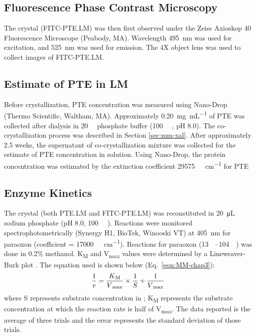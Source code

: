 \begin{refsection}
\subsection{Fluorescence Phase Contrast Microscopy}

The crystal (FITC-PTE.LM) was then first observed under the Zeiss Axioskop 40
Fluorescence Microscope (Peabody, MA).  Wavelength \SI{495}{\nm} was used for
excitation, and \SI{525}{\nm} was used for emission. The 4X object lens was used to
collect images of FITC-PTE.LM.

\subsection{Estimate of PTE in LM}

Before crystallization, PTE concentration was measured using Nano-Drop (Thermo
Scientific, Waltham, MA). Approximately \SI{0.20}{\mg\per\mL} of PTE was
collected after dialysis in \SI{20}{\milli\Molar} phosphate buffer
(\SI{100}{\micro\Molar} , pH 8.0). The co-crystallization process was
described in Section \ref{sec:mm-xal}. After approximately 2.5 weeks, the
supernatant of co-crystallization mixture was collected for the estimate of PTE
concentration in solution. Using Nano-Drop, the protein concentration was
estimated by the extinction coefficient \SI{29575}{\per\Molar\per\cm} for PTE
\cite{Gasteiger2005, Pace1995} 

\subsection{Enzyme Kinetics}

The crystal (both PTE.LM and FITC-PTE.LM) was reconstituted in
\SI{20}{\micro\liter} sodium phosphate (pH 8.0, \SI{100}{\micro\Molar}
). Reactions were monitored spectrophotometrically (Synergy H1,
BioTek, Winooski VT) at \SI{405}{\nm} for paraoxon (coefficient =
\SI{17000}{\per\Molar\per\cm}).  Reactions for paraoxon
(\SIrange{13}{104}{\micro\Molar}) was done in 0.2\% methanol.
K\textsubscript{M} and V\textsubscript{max} values were determined by a
Lineweaver-Burk plot \cite{Baker2011b}. The equation used is shown below
(Eq.~\ref{eqn:MM-chap3}): 
\begin{equation} 
    \frac{1}{v} =
    \frac{K\textsubscript{M}}{V\textsubscript{max}}\times\frac{1}{S} +
    \frac{1}{V\textsubscript{max}} 
    \label{eqn:MM-chap3}
\end{equation}
where S represents substrate concentration in \si{\Molar}; K\textsubscript{M}
represents the substrate concentration at which the reaction rate is half of
V\textsubscript{max}. The data reported is the average of three trials and the
error represents the standard deviation of those trials.


\end{refsection}
